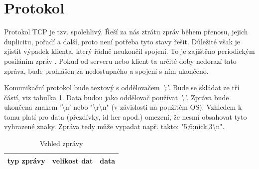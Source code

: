 \documentclass[12pt, a4paper]{article}
\begin{document}
	\section{Protokol}
	Protokol TCP je tzv. spolehlivý. Řeší za nás ztrátu zpráv během přenosu, jejich duplicitu, pořadí a další, proto není potřeba tyto stavy řešit. Důležité však je zjistit výpadek klienta, který řádně neukončil spojení. To je zajištěno periodickým posíláním zpráv \emph{}. Pokud od serveru nebo klient ta určité doby nedorazí tato zpráva, bude prohlášen za nedostupného a spojení s ním ukončeno.

	Komunikační protokol bude textový s oddělovačem \emph{';'}. Bude se skládat ze tří částí, viz tabulka \ref{Vzhled}. Data budou jako oddělovač používat \emph{','}. Zpráva bude ukončena znakem '\textbackslash n' nebo "\textbackslash r\textbackslash n" (v závislosti na použitém OS). Vzhledem k tomu platí pro data (přezdívky, id her apod.) omezení, že nesmí obsahovat tyto vyhrazené znaky. Zpráva tedy může vypadat např. takto: "5;6;nick,3\textbackslash n".
		\begin{table}[ht!]
			\centering
			\caption{Vzhled zprávy}
			\label{Vzhled}
			\begin{tabular}{| c | c | c |}
				\hline
				typ zprávy & velikost dat & data\\
				\hline
			\end{tabular}
		\end{table}
	
\end{document}
